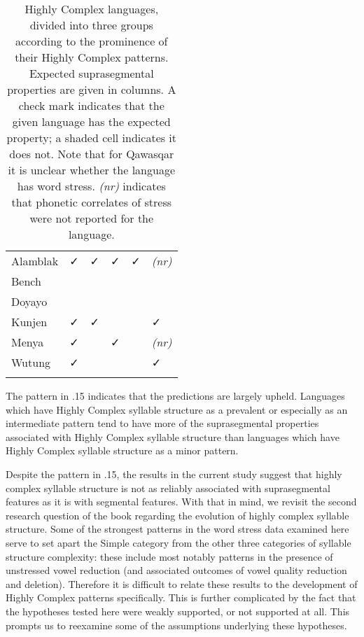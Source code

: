 \begin{table}
\begin{tabularx}{\textwidth}{XXXXXX}
\hhline{~-----}
 Alamblak & ✓ & ✓ & ✓ & ✓ & \textit{(nr)}\\
\hhline{~-----}
 Bench &  &  &  &  & \\
\hhline{~-----}
 Doyayo &  &  &  &  & \\
\hhline{~-----}
 Kunjen & ✓ & ✓ &  &  & ✓\\
\hhline{~-----}
 Menya & ✓ &  & ✓ &  & \textit{(nr)}\\
\hhline{~-----}
 Wutung & ✓ &  &  &  & ✓\\
\lspbottomrule
\end{tabularx}
\caption{\label{5.15}Highly Complex languages, divided into three groups according to the prominence of their Highly Complex patterns. Expected suprasegmental properties are given in columns. A check mark indicates that the given language has the expected property; a shaded cell indicates it does not. Note that for Qawasqar it is unclear whether the language has word stress. \textit{(nr)} indicates that phonetic correlates of stress were not reported for the language.}
\end{table}




  The pattern in .15 indicates that the predictions are largely upheld. Languages which have Highly Complex syllable structure as a prevalent or especially as an intermediate pattern tend to have more of the suprasegmental properties associated with Highly Complex syllable structure than languages which have Highly Complex syllable structure as a minor pattern.



  Despite the pattern in .15, the results in the current study suggest that highly complex syllable structure is not as reliably associated with suprasegmental features as it is with segmental features. With that in mind, we revisit the second research question of the book regarding the evolution of highly complex syllable structure. Some of the strongest patterns in the word stress data examined here serve to set apart the Simple category from the other three categories of syllable structure complexity: these include most notably patterns in the presence of unstressed vowel reduction (and associated outcomes of vowel quality reduction and deletion). Therefore it is difficult to relate these results to the development of Highly Complex patterns specifically. This is further complicated by the fact that the hypotheses tested here were weakly supported, or not supported at all. This prompts us to reexamine some of the assumptions underlying these hypotheses.



